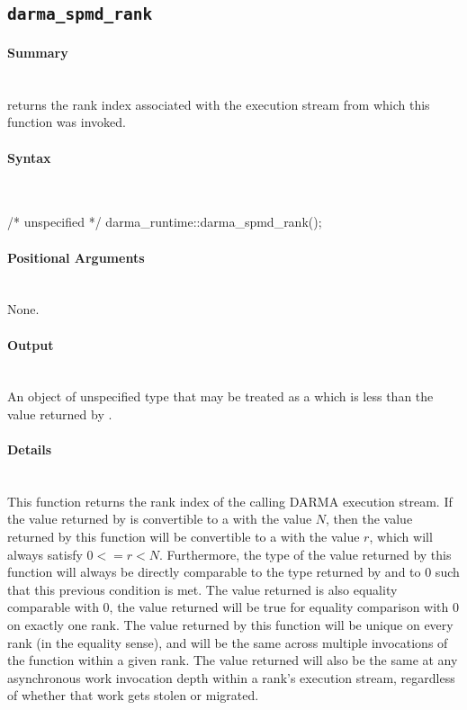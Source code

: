 


\subsection{\texttt{darma\_spmd\_rank}}

\paragraph{Summary}\mbox{}\\
 returns the \gls{rank} index associated with the
\gls{execution stream} from which this function was invoked.

\paragraph{Syntax}\mbox{}\\
\begin{CppCode}
/* unspecified */ darma_runtime::darma_spmd_rank();
\end{CppCode}

\paragraph{Positional Arguments} \mbox{}\\
None. 

\paragraph{Output}\mbox{}\\
An object of unspecified type that may be treated as a 
which is less than the value returned by .

\paragraph{Details}\mbox{}\\
This function returns the rank index of the calling \gls{DARMA} \gls{execution
stream}.  If the value returned
by  is convertible to a  with the
value $N$, then the value returned by this function will be convertible to a
 with the value $r$, which will always satisfy $0 <=
r < N$.  Furthermore, the type of the value returned by this function will
always be directly comparable to the type returned by 
and to $0$ such that this previous condition is met.  The value returned is also
equality comparable with $0$, the value returned will be true for equality
comparison with $0$ on exactly one rank.  The value returned by this function
will be unique on every \gls{rank} (in the equality sense), and will be the same
across multiple invocations of the function within a given \gls{rank}.  The value
returned will also be the same at any asynchronous work invocation depth within
a rank's \gls{execution stream}, regardless of whether that work gets stolen or
migrated.

